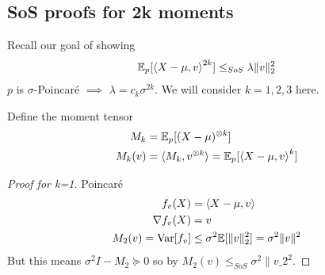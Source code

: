 \subsection{SoS proofs for 2k moments}%

Recall our goal of showing
\begin{align}
  \mathbb{E}_p[\braket{X - \mu, v}^{2k}] \leq_{SoS} \lambda \|v\|_2^2
\end{align}
$p$ is $\sigma$-Poincar\'e $\implies$ $\lambda = c_k \sigma^{2k}$.
We will consider $k = 1, 2, 3$ here.

Define the moment tensor
\begin{align}
  M_k &= \mathbb{E}_p[(X - \mu)^{\otimes k}] \\
  M_k(v) &= \braket{M_k, v^{\otimes k}} = \mathbb{E}_p[\braket{X - \mu, v}^k]
\end{align}

\begin{proof}[Proof for k=1]
  Poincar\'e
  \begin{align}
    f_v(X) &= \braket{X - \mu, v} \\
    \nabla f_v(X) &= v \\
    M_2(v) = \operatorname{Var}[f_v] &\leq \sigma^2 \mathbb{E}[\|v\|_2^2] = \sigma^2 \|v\|^2
  \end{align}
  But this means $\sigma^2 I - M_2 \succeq 0$
  so by  $M_2(v) \leq_{SoS} \sigma^2 \|v\_2^2$.
\end{proof}

